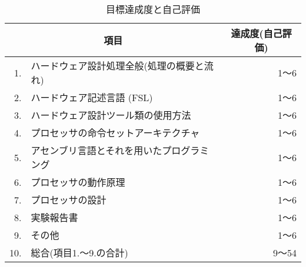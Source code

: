 \begin{table}[tb]
\caption{目標達成度と自己評価}
\label{tab:目標達成度と自己評価}
\begin{center}
{\small
\begin{tabular}{rl|r}
\hline
\hline
\multicolumn{2}{c|}{項目} & \multicolumn{1}{c}{達成度(自己評価)} \\
\hline
1. & ハードウェア設計処理全般(処理の概要と流れ) & 1〜6 \\
2. & ハードウェア記述言語 (FSL) & 1〜6 \\
3. & ハードウェア設計ツール類の使用方法 & 1〜6 \\
4. & プロセッサの命令セットアーキテクチャ & 1〜6 \\
5. & アセンブリ言語とそれを用いたプログラミング & 1〜6 \\
6. & プロセッサの動作原理 & 1〜6 \\
7. & プロセッサの設計 & 1〜6 \\
8. & 実験報告書 & 1〜6 \\
9. & その他 & 1〜6 \\
\hline
10. & 総合(項目1.〜9.の合計) & 9〜54 \\
\hline
\end{tabular}
}
\end{center}
\end{table}
